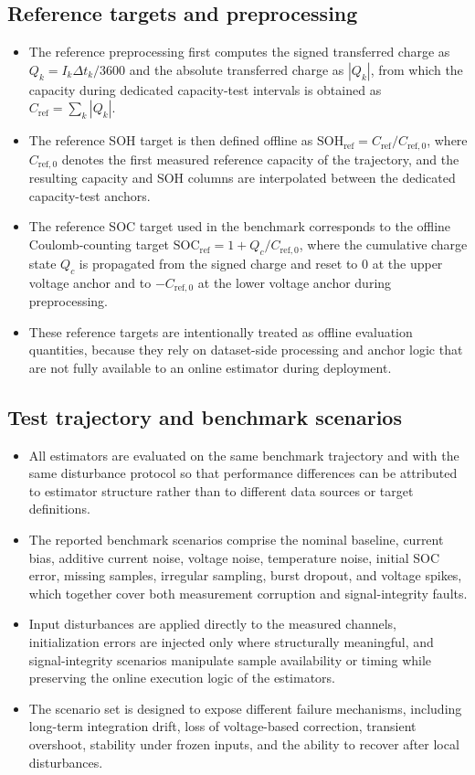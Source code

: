 \documentclass[review,nopreprintline]{elsarticle}
\begin{document}
\subsection{Reference targets and preprocessing}
\begin{itemize}[leftmargin=*]
    \item The reference preprocessing first computes the signed transferred charge as $Q_k = I_k \Delta t_k / 3600$ and the absolute transferred charge as $|Q_k|$, from which the capacity during dedicated capacity-test intervals is obtained as $C_{\mathrm{ref}} = \sum_k |Q_k|$.
    \item The reference SOH target is then defined offline as $\mathrm{SOH}_{\mathrm{ref}} = C_{\mathrm{ref}} / C_{\mathrm{ref},0}$, where $C_{\mathrm{ref},0}$ denotes the first measured reference capacity of the trajectory, and the resulting capacity and SOH columns are interpolated between the dedicated capacity-test anchors.
    \item The reference SOC target used in the benchmark corresponds to the offline Coulomb-counting target $\mathrm{SOC}_{\mathrm{ref}} = 1 + Q_c / C_{\mathrm{ref},0}$, where the cumulative charge state $Q_c$ is propagated from the signed charge and reset to $0$ at the upper voltage anchor and to $-C_{\mathrm{ref},0}$ at the lower voltage anchor during preprocessing.
    \item These reference targets are intentionally treated as offline evaluation quantities, because they rely on dataset-side processing and anchor logic that are not fully available to an online estimator during deployment.
\end{itemize}

\subsection{Test trajectory and benchmark scenarios}
\begin{itemize}[leftmargin=*]
    \item All estimators are evaluated on the same benchmark trajectory and with the same disturbance protocol so that performance differences can be attributed to estimator structure rather than to different data sources or target definitions.
    \item The reported benchmark scenarios comprise the nominal baseline, current bias, additive current noise, voltage noise, temperature noise, initial SOC error, missing samples, irregular sampling, burst dropout, and voltage spikes, which together cover both measurement corruption and signal-integrity faults.
    \item Input disturbances are applied directly to the measured channels, initialization errors are injected only where structurally meaningful, and signal-integrity scenarios manipulate sample availability or timing while preserving the online execution logic of the estimators.
    \item The scenario set is designed to expose different failure mechanisms, including long-term integration drift, loss of voltage-based correction, transient overshoot, stability under frozen inputs, and the ability to recover after local disturbances.
\end{itemize}
\end{document}
